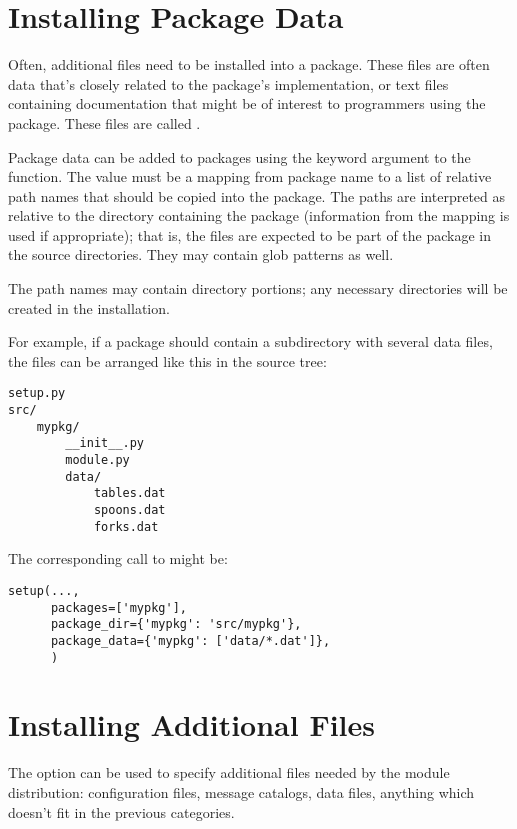 \documentclass{manual}
\begin{document}
\section{Installing Package Data}

Often, additional files need to be installed into a package.  These
files are often data that's closely related to the package's
implementation, or text files containing documentation that might be
of interest to programmers using the package.  These files are called
.

Package data can be added to packages using the 
keyword argument to the  function.  The value must
be a mapping from package name to a list of relative path names that
should be copied into the package.  The paths are interpreted as
relative to the directory containing the package (information from the
 mapping is used if appropriate); that is, the files
are expected to be part of the package in the source directories.
They may contain glob patterns as well.

The path names may contain directory portions; any necessary
directories will be created in the installation.

For example, if a package should contain a subdirectory with several
data files, the files can be arranged like this in the source tree:

\begin{verbatim}
setup.py
src/
    mypkg/
        __init__.py
        module.py
        data/
            tables.dat
            spoons.dat
            forks.dat
\end{verbatim}

The corresponding call to  might be:

\begin{verbatim}
setup(...,
      packages=['mypkg'],
      package_dir={'mypkg': 'src/mypkg'},
      package_data={'mypkg': ['data/*.dat']},
      )
\end{verbatim}




\section{Installing Additional Files}

The  option can be used to specify additional
files needed by the module distribution: configuration files, message
catalogs, data files, anything which doesn't fit in the previous
categories.
\end{document}
